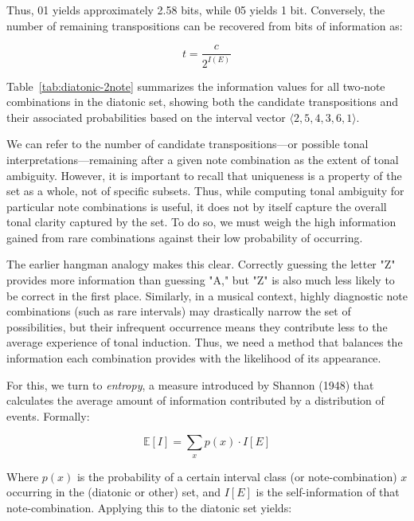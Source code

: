\documentclass[10pt,twocolumn]{article}
\numberwithin{equation}{section} %
\begin{document}
    Thus, 01 yields approximately 2.58 bits, while 05 yields 1 bit.
    Conversely, the number of remaining transpositions can be recovered from bits of information as:

    \begin{equation}
        t = \frac{c}{2^{I(E)}}
        \label{eq:remaining_transpositions}
    \end{equation}

    Table~\ref{tab:diatonic-2note} summarizes the information values for all two‑note combinations in the diatonic set, showing both the candidate transpositions and their associated probabilities based on the interval vector $\langle 2,5,4,3,6,1\rangle$.

    

    We can refer to the number of candidate transpositions—or possible tonal interpretations—remaining after a given note combination as the extent of tonal ambiguity.
    However, it is important to recall that uniqueness is a property of the set as a whole, not of specific subsets.
    Thus, while computing tonal ambiguity for particular note combinations is useful, it does not by itself capture the overall tonal clarity captured by the set.
    To do so, we must weigh the high information gained from rare combinations against their low probability of occurring.

    The earlier hangman analogy makes this clear.
    Correctly guessing the letter "Z" provides more information than guessing "A," but "Z" is also much less likely to be correct in the first place.
    Similarly, in a musical context, highly diagnostic note combinations (such as rare intervals) may drastically narrow the set of possibilities, but their infrequent occurrence means they contribute less to the average experience of tonal induction.
    Thus, we need a method that balances the information each combination provides with the likelihood of its appearance.

    For this, we turn to \textit{entropy}, a measure introduced by Shannon (1948) that calculates the average amount of information contributed by a distribution of events.
    Formally:

    \begin{equation}
        \mathbb{E}[I] = \sum_{x} p(x) \cdot I[E]
        \label{eq:expected-info}
    \end{equation}

    Where $p(x)$ is the probability of a certain interval class (or note-combination) $x$ occurring in the (diatonic or other) set, and $I[E]$ is the self-information of that note-combination.
    Applying this to the diatonic set yields:
\end{document}
